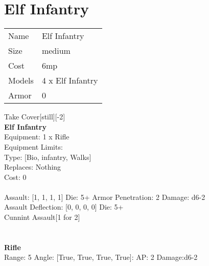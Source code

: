 \pagebreak

\section{ Elf Infantry }

\begin{tabular}{ll}
  Name & Elf Infantry \\
  Size & medium\\
  Cost & 6mp\\
  Models & 4 x Elf Infantry\\
  Armor & 0\\
\end{tabular}

\noindent Take Cover[still][-2]\\ 


{\bf Elf Infantry } \\
Equipment: 1 x Rifle \\
Equipment Limits:  \\
Type: [Bio, infantry, Walks] \\
Replaces: Nothing \\
Cost: 0\\
\ \\
Assault: [1, 1, 1, 1] Die: 5+ Armor Penetration: 2 Damage: d6-2 \\
Assault Deflection: [0, 0, 0, 0] Die: 5+\\
\indent Cunnint Assault[1 for 2]\\ 
 
\ \\

\ \\
{\bf Rifle } \\



Range: 5  Angle: [True, True, True, True]: AP: 2 Damage:d6-2 \\




 
\ \\



